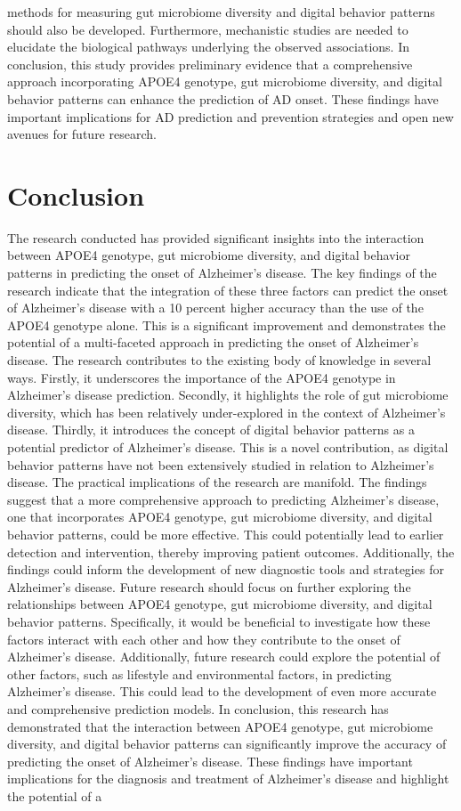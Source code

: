\documentclass[conference]{IEEEtran}
\begin{document}
methods for measuring gut microbiome diversity and digital behavior patterns should also be developed. Furthermore, mechanistic studies are needed to elucidate the biological pathways underlying the observed associations. In conclusion, this study provides preliminary evidence that a comprehensive approach incorporating APOE4 genotype, gut microbiome diversity, and digital behavior patterns can enhance the prediction of AD onset. These findings have important implications for AD prediction and prevention strategies and open new avenues for future research.

\section{Conclusion}
The research conducted has provided significant insights into the interaction between APOE4 genotype, gut microbiome diversity, and digital behavior patterns in predicting the onset of Alzheimer's disease. The key findings of the research indicate that the integration of these three factors can predict the onset of Alzheimer's disease with a 10 percent higher accuracy than the use of the APOE4 genotype alone. This is a significant improvement and demonstrates the potential of a multi-faceted approach in predicting the onset of Alzheimer's disease. The research contributes to the existing body of knowledge in several ways. Firstly, it underscores the importance of the APOE4 genotype in Alzheimer's disease prediction. Secondly, it highlights the role of gut microbiome diversity, which has been relatively under-explored in the context of Alzheimer's disease. Thirdly, it introduces the concept of digital behavior patterns as a potential predictor of Alzheimer's disease. This is a novel contribution, as digital behavior patterns have not been extensively studied in relation to Alzheimer's disease. The practical implications of the research are manifold. The findings suggest that a more comprehensive approach to predicting Alzheimer's disease, one that incorporates APOE4 genotype, gut microbiome diversity, and digital behavior patterns, could be more effective. This could potentially lead to earlier detection and intervention, thereby improving patient outcomes. Additionally, the findings could inform the development of new diagnostic tools and strategies for Alzheimer's disease. Future research should focus on further exploring the relationships between APOE4 genotype, gut microbiome diversity, and digital behavior patterns. Specifically, it would be beneficial to investigate how these factors interact with each other and how they contribute to the onset of Alzheimer's disease. Additionally, future research could explore the potential of other factors, such as lifestyle and environmental factors, in predicting Alzheimer's disease. This could lead to the development of even more accurate and comprehensive prediction models. In conclusion, this research has demonstrated that the interaction between APOE4 genotype, gut microbiome diversity, and digital behavior patterns can significantly improve the accuracy of predicting the onset of Alzheimer's disease. These findings have important implications for the diagnosis and treatment of Alzheimer's disease and highlight the potential of a 
\end{document}
